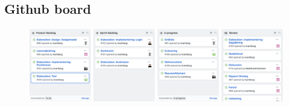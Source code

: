 \documentclass[../main.tex]{subfiles}
\begin{document}
  \subsection{Github board}
  \begin{figure}[H]
    \centering
    \begin{sideways}
    	\includegraphics[scale=.32]{figurer/kanban.png}
    \end{sideways}
    \label{fig:github_board_stor}
  \end{figure}
  
 
\end{document}
